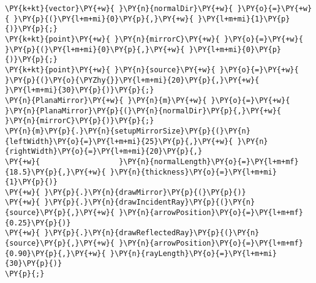 \begin{Verbatim}[commandchars=\\\{\}]
\PY{k+kt}{vector}\PY{+w}{ }\PY{n}{normalDir}\PY{+w}{ }\PY{o}{=}\PY{+w}{ }\PY{p}{(}\PY{l+m+mi}{0}\PY{p}{,}\PY{+w}{ }\PY{l+m+mi}{1}\PY{p}{)}\PY{p}{;}
\PY{k+kt}{point}\PY{+w}{ }\PY{n}{mirrorC}\PY{+w}{ }\PY{o}{=}\PY{+w}{ }\PY{p}{(}\PY{l+m+mi}{0}\PY{p}{,}\PY{+w}{ }\PY{l+m+mi}{0}\PY{p}{)}\PY{p}{;}
\PY{k+kt}{point}\PY{+w}{ }\PY{n}{source}\PY{+w}{ }\PY{o}{=}\PY{+w}{ }\PY{p}{(}\PY{o}{\PYZhy{}}\PY{l+m+mi}{20}\PY{p}{,}\PY{+w}{ }\PY{l+m+mi}{30}\PY{p}{)}\PY{p}{;}
\PY{n}{PlanaMirror}\PY{+w}{ }\PY{n}{m}\PY{+w}{ }\PY{o}{=}\PY{+w}{ }\PY{n}{PlanaMirror}\PY{p}{(}\PY{n}{normalDir}\PY{p}{,}\PY{+w}{ }\PY{n}{mirrorC}\PY{p}{)}\PY{p}{;}
\PY{n}{m}\PY{p}{.}\PY{n}{setupMirrorSize}\PY{p}{(}\PY{n}{leftWidth}\PY{o}{=}\PY{l+m+mi}{25}\PY{p}{,}\PY{+w}{ }\PY{n}{rightWidth}\PY{o}{=}\PY{l+m+mi}{20}\PY{p}{,}
\PY{+w}{                  }\PY{n}{normalLength}\PY{o}{=}\PY{l+m+mf}{18.5}\PY{p}{,}\PY{+w}{ }\PY{n}{thickness}\PY{o}{=}\PY{l+m+mi}{1}\PY{p}{)}
\PY{+w}{ }\PY{p}{.}\PY{n}{drawMirror}\PY{p}{(}\PY{p}{)}
\PY{+w}{ }\PY{p}{.}\PY{n}{drawIncidentRay}\PY{p}{(}\PY{n}{source}\PY{p}{,}\PY{+w}{ }\PY{n}{arrowPosition}\PY{o}{=}\PY{l+m+mf}{0.25}\PY{p}{)}
\PY{+w}{ }\PY{p}{.}\PY{n}{drawReflectedRay}\PY{p}{(}\PY{n}{source}\PY{p}{,}\PY{+w}{ }\PY{n}{arrowPosition}\PY{o}{=}\PY{l+m+mf}{0.90}\PY{p}{,}\PY{+w}{ }\PY{n}{rayLength}\PY{o}{=}\PY{l+m+mi}{30}\PY{p}{)}
\PY{p}{;}
\end{Verbatim}
